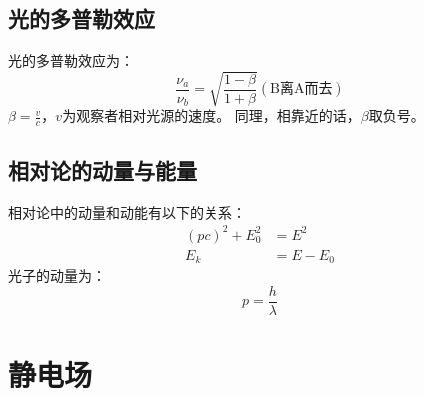 \documentclass{ctexart}
\begin{document}
\subsection{光的多普勒效应}
光的多普勒效应为：
$$
    \frac{\nu_a}{\nu_b} = \sqrt{\frac{1-\beta}{1+\beta}}(\text{B离A而去})
$$
$\beta=\frac{v}{c}$，$v$为观察者相对光源的速度。
同理，相靠近的话，$\beta$取负号。
\subsection{相对论的动量与能量}
相对论中的动量和动能有以下的关系：
\begin{align*}
    (pc)^2 +E_0^2 &= E^2 \\
    E_k &= E - E_0
\end{align*}
光子的动量为：
$$
    p = \frac{h}{\lambda}
$$
\section{静电场}
\end{document}
